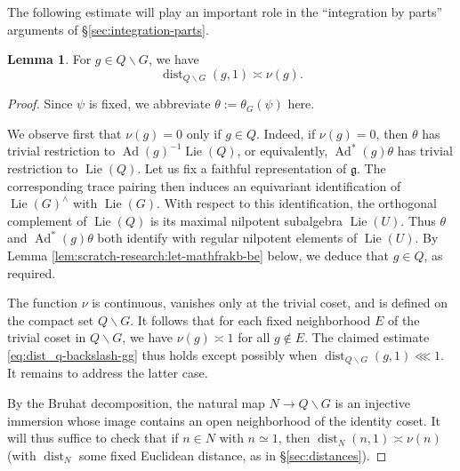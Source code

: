 \documentclass[reqno]{amsart}
\DeclareMathOperator{\Ad}{Ad}
\DeclareMathOperator{\dist}{dist}
\DeclareMathOperator{\Lie}{Lie}
\theoremstyle{plain} \newtheorem{theorem} {Theorem}
\theoremstyle{definition} \newtheorem{definition} [theorem] {Definition}
\theoremstyle{itplain} %
\newtheorem{lemma}[theorem]{Lemma}
\numberwithin{equation}{section}
\numberwithin{theorem}{section}
\begin{document}
The following estimate will play an important role in the ``integration by parts'' arguments of \S\ref{sec:integration-parts}.
\begin{lemma}\label{lem:sub-gln:g-in-q}
  For $g \in Q \backslash G$, we have
  \begin{equation}\label{eq:dist_q-backslash-gg}
    \dist_{Q \backslash G}(g, 1) \asymp \nu(g).
  \end{equation}
\end{lemma}
\begin{proof}
  Since $\psi$ is fixed, we abbreviate $\theta := \theta_G(\psi)$ here.
  
  We observe first that $\nu(g) = 0$ only if $g \in Q$.  Indeed, if $\nu(g) = 0$, then $\theta$ has trivial restriction to $\Ad(g)^{-1} \Lie(Q)$, or equivalently, $\Ad^*(g) \theta$ has trivial restriction to $\Lie(Q)$.  Let us fix a faithful representation of $\mathfrak{g}$.  The corresponding trace pairing then induces an equivariant identification of $\Lie(G)^\wedge$ with $\Lie(G)$.  With respect to this identification, the orthogonal complement of $\Lie(Q)$ is its maximal nilpotent subalgebra $\Lie(U)$.  Thus $\theta$ and $\Ad^*(g) \theta$ both identify with regular nilpotent elements of $\Lie(U)$.  By Lemma \ref{lem:scratch-research:let-mathfrakb-be} below, we deduce that $g \in Q$, as required.


  The function $\nu$ is continuous, vanishes only at the trivial coset, and is defined on the compact set $Q \backslash G$.  It follows that for each fixed neighborhood $E$ of the trivial coset in $Q \backslash G$, we have $\nu(g) \asymp 1$ for all $g \notin E$.  The claimed estimate \eqref{eq:dist_q-backslash-gg} thus holds except possibly when $\dist_{Q \backslash G}(g,1) \lll 1$.  It remains to address the latter case.

  By the Bruhat decomposition, the natural map $N \rightarrow Q \backslash G$ is an injective immersion whose image contains an open neighborhood of the identity coset.  It will thus suffice to check that if $n \in N$ with $n \simeq 1$, then $\dist_{N}(n,1) \asymp \nu(n)$ (with $\dist_N$ some fixed Euclidean distance, as in \S\ref{sec:distances}).


\end{proof}
\end{document}
